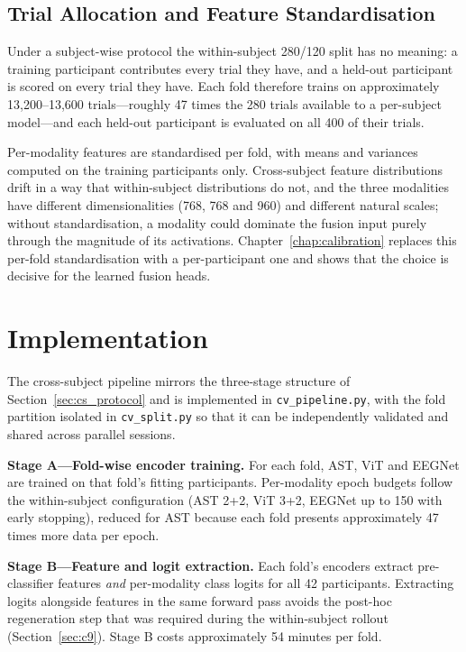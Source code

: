 \subsection{Trial Allocation and Feature Standardisation}

Under a subject-wise protocol the within-subject 280/120 split has no meaning: a
training participant contributes every trial they have, and a held-out participant is
scored on every trial they have. Each fold therefore trains on approximately
13,200--13,600 trials---roughly 47 times the 280 trials available to a per-subject
model---and each held-out participant is evaluated on all 400 of their trials.

Per-modality features are standardised per fold, with means and variances computed on
the training participants only. Cross-subject feature distributions drift in a way
that within-subject distributions do not, and the three modalities have different
dimensionalities (768, 768 and 960) and different natural scales; without
standardisation, a modality could dominate the fusion input purely through the
magnitude of its activations. Chapter~\ref{chap:calibration} replaces this per-fold
standardisation with a per-participant one and shows that the choice is decisive for
the learned fusion heads.

\section{Implementation}
\label{sec:cs_implementation}

The cross-subject pipeline mirrors the three-stage structure of
Section~\ref{sec:cs_protocol} and is implemented in \texttt{cv\_pipeline.py}, with the
fold partition isolated in \texttt{cv\_split.py} so that it can be independently
validated and shared across parallel sessions.

\textbf{Stage A---Fold-wise encoder training.} For each fold, AST, ViT and EEGNet are
trained on that fold's fitting participants. Per-modality epoch budgets follow the
within-subject configuration (AST 2+2, ViT 3+2, EEGNet up to 150 with early stopping),
reduced for AST because each fold presents approximately 47 times more data per epoch.

\textbf{Stage B---Feature and logit extraction.} Each fold's encoders extract
pre-classifier features \emph{and} per-modality class logits for all 42 participants.
Extracting logits alongside features in the same forward pass avoids the post-hoc
regeneration step that was required during the within-subject rollout
(Section~\ref{sec:c9}). Stage B costs approximately 54 minutes per fold.

